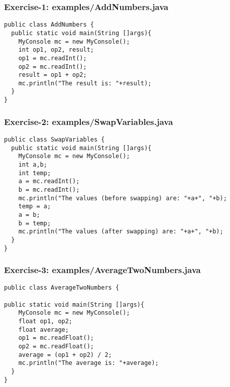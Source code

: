 \documentclass[xcolor=dvipsnames,dvip,notes=show,table]{beamer}
\begin{document}
\begin{frame}[fragile]
\frametitle{Exercise-1: examples/AddNumbers.java}
\scriptsize
\begin{lstlisting}
public class AddNumbers {
  public static void main(String []args){
    MyConsole mc = new MyConsole();
    int op1, op2, result;
    op1 = mc.readInt();
    op2 = mc.readInt();
    result = op1 + op2;
    mc.println("The result is: "+result);
  }
}
\end{lstlisting}
\end{frame}




\begin{frame}[fragile]
\frametitle{Exercise-2: examples/SwapVariables.java}
\scriptsize
\begin{lstlisting}
public class SwapVariables {
  public static void main(String []args){
    MyConsole mc = new MyConsole();
    int a,b;
    int temp;
    a = mc.readInt();
    b = mc.readInt();
    mc.println("The values (before swapping) are: "+a+", "+b);
    temp = a;
    a = b;
    b = temp;
    mc.println("The values (after swapping) are: "+a+", "+b);
  }
}
\end{lstlisting}
\end{frame}





\begin{frame}[fragile]
\frametitle{Exercise-3: examples/AverageTwoNumbers.java}
\scriptsize
\begin{lstlisting}
public class AverageTwoNumbers {

public static void main(String []args){
    MyConsole mc = new MyConsole();
    float op1, op2;
    float average;
    op1 = mc.readFloat();
    op2 = mc.readFloat();
    average = (op1 + op2) / 2;
    mc.println("The average is: "+average);
  }
}
\end{lstlisting}
\end{frame}


\end{document}
